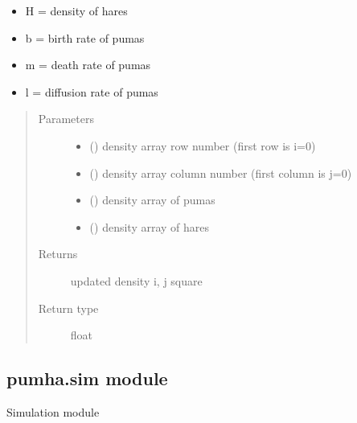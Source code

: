 \documentclass[letterpaper,10pt,english]{sphinxmanual}
\begin{document}
\begin{fulllineitems}
\begin{fulllineitems}
\begin{itemize}
\item {} 
H = density of hares

\item {} 
b = birth rate of pumas

\item {} 
m = death rate of pumas

\item {} 
l = diffusion rate of pumas

\end{itemize}
\begin{quote}\begin{description}
\item[{Parameters}] \leavevmode\begin{itemize}
\item {} 
 () \textendash{} density array row number (first row is i=0)

\item {} 
 () \textendash{} density array column number (first column is j=0)

\item {} 
 () \textendash{} density array of pumas

\item {} 
 () \textendash{} density array of hares

\end{itemize}

\item[{Returns}] \leavevmode
updated density i, j square

\item[{Return type}] \leavevmode
float

\end{description}\end{quote}

\end{fulllineitems}


\end{fulllineitems}



\subsection{pumha.sim module}
\label{\detokenize{pumha:pumha-sim-module}}\label{\detokenize{pumha:module-pumha.sim}}
Simulation module
\end{document}

